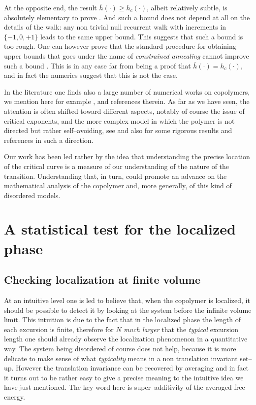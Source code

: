 \documentclass[reqno,11pt]{amsart}
\numberwithin{equation}{section}
\begin{document}
\smallskip

At the opposite end, the result $\overline{h}(\cdot)\ge h_c(\cdot)$, albeit
relatively subtle,
is absolutely elementary to prove \cite{cf:BdH}. And such a bound does not depend at all
on the details of the walk: any non trivial null
recurrent walk with increments in $\{-1, 0, +1\}$ leads to the
same upper bound. This suggests that such a bound
is too rough. One can however prove that the standard procedure
for obtaining upper bounds that goes under the name of
{\sl constrained annealing} cannot improve such a bound \cite{cf:CG}.
This is in any case far from being a proof that $\overline{h}(\cdot)= h_c(\cdot)$,
and in fact the numerics suggest that this is not the case.

\smallskip

In the literature one finds also a large number of numerical works on copolymers,
we mention here for example \cite{cf:CW}, \cite{cf:SW} and references therein.
As far as we have seen, the attention is often shifted toward different aspects,
notably of course the  issue of critical exponents, and the more
complex model in which the polymer is not directed but rather self--avoiding,
see   \cite{cf:CW} and \cite{cf:SW} also for some rigorous results and references in such a direction.

Our work has been led rather by the idea that understanding
the precise location of the critical curve is a measure of our understanding of the nature of the transition. Understanding that, in turn, could promote an advance on the mathematical analysis of the copolymer and, more generally,  of this kind of disordered models.






\section{A statistical test for the localized phase}
\label{sec:testing}

\subsection{Checking localization at finite volume}
\label{sec:superadd}
At an intuitive level one is led to believe that, when the copolymer is localized,
it should be possible to detect it
by looking at the system before the infinite volume limit.
This intuition is due to the fact that in the localized phase
the length of each excursion is finite, therefore for $N$ {\sl much larger }
that the {\sl typical} excursion length one should already observe the
localization phenomenon in a quantitative way.
The system being disordered of course does not help,
because it is more delicate to make sense of what
{\sl typicality} means in a non translation invariant set--up.
 However the translation invariance can be recovered
 by averaging and in fact it turns out to be rather easy to give
 a precise meaning to the intuitive idea we have just mentioned.
 The key word here is super--additivity of the averaged free energy.
 \smallskip
\end{document}
